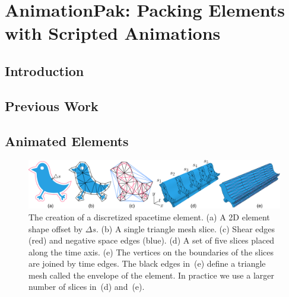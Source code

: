 \chapter{AnimationPak: Packing Elements with Scripted Animations}


\section{Introduction}


\section{Previous Work}


\section{Animated Elements}

\begin{figure}
\centering
\includegraphics[width=1.0\textwidth]{figures/animationpak/discretization.pdf} 
\caption[The creation of a discretized spacetime element]
{\label{fig_discretization} 
The creation of a discretized spacetime element.  
(a) A 2D element shape offset by $\Delta s$.
(b) A single triangle mesh slice.
(c) Shear edges (red) and negative space edges (blue).
(d) A set of five slices placed along the time axis.
(e) The vertices on the boundaries of the slices are joined by 
	time edges.  The black edges in~(e) define a triangle mesh
	called the envelope of the element.
	In practice we use a larger number of slices in~(d) and~(e).
}
\end{figure}

